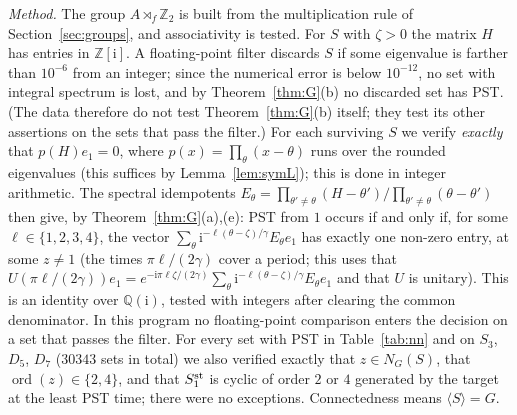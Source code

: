 \documentclass[preprint,11pt]{elsarticle}
\theoremstyle{definition}
\theoremstyle{remark}
\DeclareMathOperator{\ord}{ord}
\newcommand{\Z}{\mathbb Z}
\newcommand{\Q}{\mathbb Q}
\newcommand{\ii}{\mathrm i}
\begin{document}
\medskip\noindent\emph{Method.} The group $A\rtimes_f\Z_2$ is built from the multiplication rule of Section~\ref{sec:groups}, and associativity is tested. For $S$ with $\zeta>0$ the matrix $H$ has entries in $\mathbb Z[\ii]$. A floating-point filter discards $S$ if some eigenvalue is farther than $10^{-6}$ from an integer; since the numerical error is below $10^{-12}$, no set with integral spectrum is lost, and by Theorem~\ref{thm:G}(b) no discarded set has PST. (The data therefore do not test Theorem~\ref{thm:G}(b) itself; they test its other assertions on the sets that pass the filter.) For each surviving $S$ we verify \emph{exactly} that $p(H)e_1=0$, where $p(x)=\prod_\theta(x-\theta)$ runs over the rounded eigenvalues (this suffices by Lemma~\ref{lem:symL}); this is done in integer arithmetic. The spectral idempotents $E_\theta=\prod_{\theta'\ne\theta}(H-\theta')/\prod_{\theta'\ne\theta}(\theta-\theta')$ then give, by Theorem~\ref{thm:G}(a),(e): PST from $1$ occurs if and only if, for some $\ell\in\{1,2,3,4\}$, the vector $\sum_\theta\ii^{-\ell(\theta-\zeta)/\gamma}E_\theta e_1$ has exactly one non-zero entry, at some $z\ne1$ (the times $\pi\ell/(2\gamma)$ cover a period; this uses that $U(\pi\ell/(2\gamma))e_1=e^{-\ii\pi\ell\zeta/(2\gamma)}\sum_\theta\ii^{-\ell(\theta-\zeta)/\gamma}E_\theta e_1$ and that $U$ is unitary). This is an identity over $\Q(\ii)$, tested with integers after clearing the common denominator. In this program no floating-point comparison enters the decision on a set that passes the filter. For every set with PST in Table~\ref{tab:nn} and on $S_3$, $D_5$, $D_7$ ($30343$ sets in total) we also verified exactly that $z\in N_G(S)$, that $\ord(z)\in\{2,4\}$, and that $S_1^{\rm st}$ is cyclic of order $2$ or $4$ generated by the target at the least PST time; there were no exceptions. Connectedness means $\langle S\rangle=G$.
\end{document}
